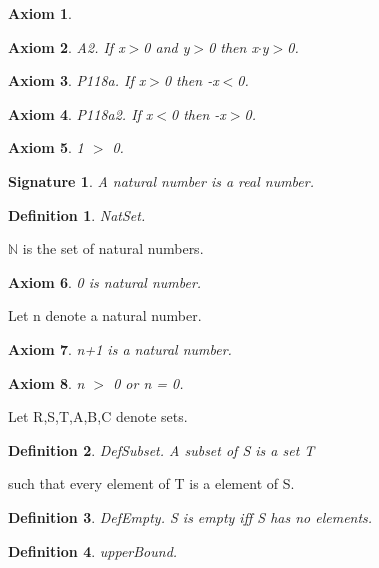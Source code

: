 \documentclass{article}
\newenvironment{forthel}{\begin{leftbar}}{\end{leftbar}}
\newtheorem{axiom}{Axiom}
\newtheorem{definition}{Definition}
\newtheorem{signature}{Signature}
\begin{document}
\begin{forthel}
\begin{axiom}
\end{axiom}
\begin{axiom} A2. If x$>$0 and y$>$0 then x$\cdot$y$>$0.

\end{axiom}

\begin{axiom} P118a. If x$>$0 then -x$<$0.

\end{axiom}
\begin{axiom} P118a2. If x$<$0 then -x$>$0.

\end{axiom}

\begin{axiom} 1 $>$ 0.

\end{axiom}


\begin{signature} A natural number is a real number.

\end{signature}

\begin{definition} NatSet.

\end{definition}
$\mathbb{N}$ is the set of natural numbers.

\begin{axiom} 0 is natural number.

\end{axiom}
Let n denote a natural number.
\begin{axiom} n+1 is a natural number.

\end{axiom}
\begin{axiom} n $>$ 0 or n = 0.

\end{axiom}




Let R,S,T,A,B,C denote sets.

\begin{definition} DefSubset.   A subset of S is a set T

\end{definition}
such that every element of T is a element of S.

\begin{definition} DefEmpty.    S is empty iff S has no elements.

\end{definition}


\begin{definition} upperBound.


\end{definition}
\end{forthel}
\end{document}
